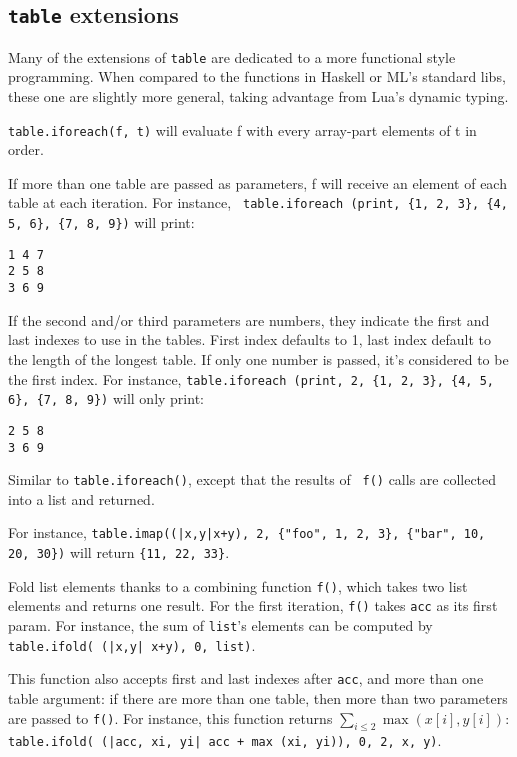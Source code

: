 \subsection{{\tt table} extensions}

Many of the extensions of {\tt table} are dedicated to a more
functional style programming. When compared to the functions in
Haskell or ML's standard libs, these one are slightly more general,
taking advantage from Lua's dynamic typing.


{\tt table.iforeach(f, t)} will evaluate f with every array-part
elements of t in order.

If more than one table are passed as parameters, f will receive an
element of each table at each iteration. For instance, {\tt
  table.iforeach (print, \{1, 2, 3\}, \{4, 5, 6\}, \{7, 8, 9\})} will
print:
\begin{verbatim}
1 4 7
2 5 8
3 6 9
\end{verbatim}

If the second and/or third parameters are numbers, they indicate the
first and last indexes to use in the tables. First index defaults to
1, last index default to the length of the longest table. If only one
number is passed, it's considered to be the first index. For instance,
{\tt table.iforeach (print, 2, \{1, 2, 3\}, \{4, 5, 6\}, \{7, 8, 9\})}
will only print:
\begin{verbatim}
2 5 8
3 6 9
\end{verbatim}


Similar to {\tt table.iforeach()}, except that the results of {\tt
  f()} calls are collected into a list and returned.

For instance, {\tt table.imap((|x,y|x+y), 2, \{"foo", 1, 2, 3\},
  \{"bar", 10, 20, 30\})} will return {\tt\{11, 22, 33\}}.


Fold list elements thanks to a combining function {\tt f()}, which
takes two list elements and returns one result. For the first
iteration, {\tt f()} takes {\tt acc} as its first param. For instance,
the sum of {\tt list}'s elements can be computed by {\tt table.ifold(
  (|x,y| x+y), 0, list)}.

This function also accepts first and last indexes after {\tt acc}, and
more than one table argument: if there are more than one table, then
more than two parameters are passed to {\tt f()}. For instance, this
function returns $\sum_{i\le2} \max(x[i], y[i])$: {\tt
  table.ifold( (|acc, xi, yi| acc + max (xi, yi)), 0, 2, x, y)}.

